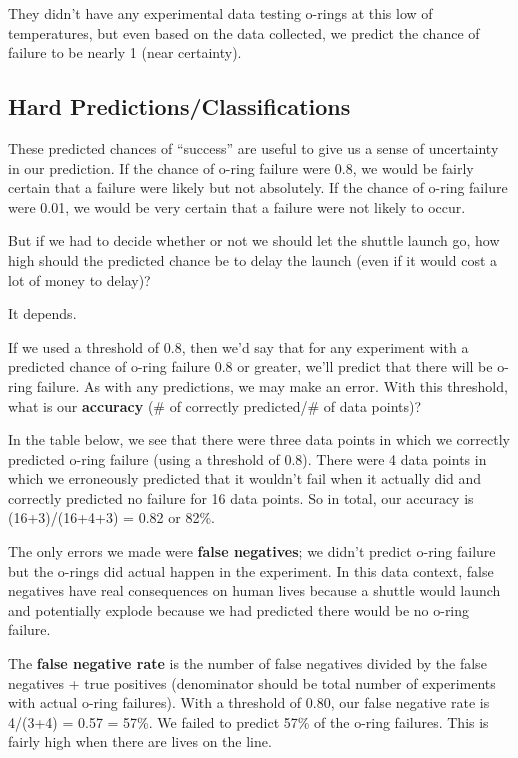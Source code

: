 \documentclass[]{book}
\begin{document}
They didn't have any experimental data testing o-rings at this low of temperatures, but even based on the data collected, we predict the chance of failure to be nearly 1 (near certainty).

\hypertarget{hard-predictionsclassifications}{%
\subsection{Hard Predictions/Classifications}\label{hard-predictionsclassifications}}

These predicted chances of ``success'' are useful to give us a sense of uncertainty in our prediction. If the chance of o-ring failure were 0.8, we would be fairly certain that a failure were likely but not absolutely. If the chance of o-ring failure were 0.01, we would be very certain that a failure were not likely to occur.

But if we had to decide whether or not we should let the shuttle launch go, how high should the predicted chance be to delay the launch (even if it would cost a lot of money to delay)?

It depends.

If we used a threshold of 0.8, then we'd say that for any experiment with a predicted chance of o-ring failure 0.8 or greater, we'll predict that there will be o-ring failure. As with any predictions, we may make an error. With this threshold, what is our \textbf{accuracy} (\# of correctly predicted/\# of data points)?

In the table below, we see that there were three data points in which we correctly predicted o-ring failure (using a threshold of 0.8). There were 4 data points in which we erroneously predicted that it wouldn't fail when it actually did and correctly predicted no failure for 16 data points. So in total, our accuracy is (16+3)/(16+4+3) = 0.82 or 82\%.

The only errors we made were \textbf{false negatives}; we didn't predict o-ring failure but the o-rings did actual happen in the experiment. In this data context, false negatives have real consequences on human lives because a shuttle would launch and potentially explode because we had predicted there would be no o-ring failure.

The \textbf{false negative rate} is the number of false negatives divided by the false negatives + true positives (denominator should be total number of experiments with actual o-ring failures). With a threshold of 0.80, our false negative rate is 4/(3+4) = 0.57 = 57\%. We failed to predict 57\% of the o-ring failures. This is fairly high when there are lives on the line.
\end{document}
